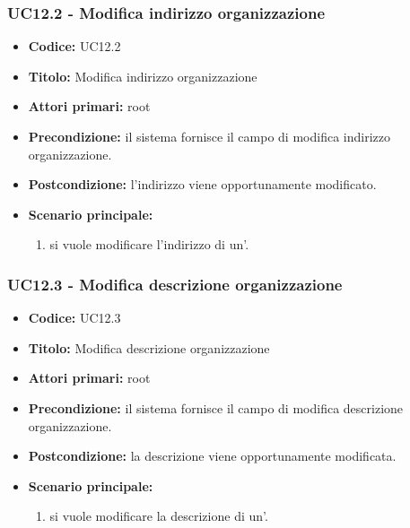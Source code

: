 \documentclass[casi-duso]{subfiles}
\begin{document}
\subsubsection{UC12.2 - Modifica indirizzo organizzazione}
\label{subsub:UC12.2}
\begin{itemize}
  \item \textbf{Codice:} UC12.2
  \item \textbf{Titolo:} Modifica indirizzo organizzazione
  \item \textbf{Attori primari:} root
  \item \textbf{Precondizione:} il sistema fornisce il campo di modifica indirizzo organizzazione.
  \item \textbf{Postcondizione:} l'indirizzo viene opportunamente modificato.
  \item \textbf{Scenario principale:}
  \begin{enumerate}
    \item si vuole modificare l'indirizzo di un'.
  \end{enumerate}
\end{itemize}

\subsubsection{UC12.3 - Modifica descrizione organizzazione}
\label{subsub:UC12.3}
\begin{itemize}
  \item \textbf{Codice:} UC12.3
  \item \textbf{Titolo:} Modifica descrizione organizzazione
  \item \textbf{Attori primari:} root
  \item \textbf{Precondizione:} il sistema fornisce il campo di modifica descrizione organizzazione.
  \item \textbf{Postcondizione:} la descrizione viene opportunamente modificata.
  \item \textbf{Scenario principale:}
  \begin{enumerate}
    \item si vuole modificare la descrizione di un'.
  \end{enumerate}
\end{itemize}
\end{document}
